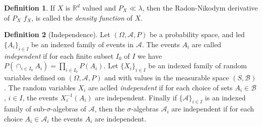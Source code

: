 \documentclass[12pt]{article}
\theoremstyle{definition}
\newtheorem{definition}{Definition}[section]
\newcommand{\real}{\mathbb{R}}   %
\newcommand{\algebra}{\mathscr{A}}
\begin{document}
\begin{definition}
    If $X$ is $\real^d$ valued and $P_X\ll\lambda$, then the Radon-Nikodym derivative of $P_X$ $f_X$, is called the \textit{density function} of $X$.
\end{definition}
\begin{definition}[Independence]
    Let $(\Omega,\algebra,P)$ be a probability space, and led $\{A_i\}_{i\in I}$ be an indexed family of events in $\algebra$. The events $A_i$ are called \textit{independent} if for each finite subset $I_0$ of $I$ we have $P(\cap_{i\in I_0} A_i)=\prod_{i\in I_0} P(A_i)$. Let $\{X_i\}_{i\in I}$ be an indexed family of random variables defined on $(\Omega,\algebra,P)$ and with values in the measurable space $(S,\mathscr{B})$. The random variables $X_i$ are aclled \textit{independent} if for each choice of sets $A_i\in\mathscr{B}$, $i\in I$, the events $X_i^{-1}(A_i)$ are independent. Finally if $\{\algebra\}_{i\in I}$ is an indexed family of sub-$\sigma$-algebras of $\algebra$, then the $\sigma$-algebras $\algebra_i$ are independent if for each choice $A_i\in\algebra_i$ the events $A_i$ are independent.
\end{definition}
\end{document}
